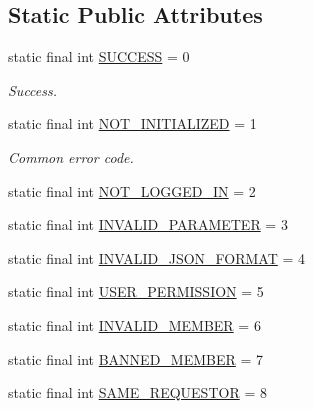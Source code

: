 \subsection*{Static Public Attributes}
\begin{DoxyCompactItemize}
\item 
static final int \hyperlink{classcom_1_1toast_1_1android_1_1gamebase_1_1base_1_1_gamebase_error_a78a8f85131c22ffd108d29766b27f2e5}{S\+U\+C\+C\+E\+SS} = 0
\begin{DoxyCompactList}\small\item\em Success. \end{DoxyCompactList}\item 
static final int \hyperlink{classcom_1_1toast_1_1android_1_1gamebase_1_1base_1_1_gamebase_error_a8eee16890e4829932e769351891ab2e5}{N\+O\+T\+\_\+\+I\+N\+I\+T\+I\+A\+L\+I\+Z\+ED} = 1
\begin{DoxyCompactList}\small\item\em Common error code. \end{DoxyCompactList}\item 
static final int \hyperlink{classcom_1_1toast_1_1android_1_1gamebase_1_1base_1_1_gamebase_error_acf8c8ed3996407204f4905342cbdb656}{N\+O\+T\+\_\+\+L\+O\+G\+G\+E\+D\+\_\+\+IN} = 2
\item 
static final int \hyperlink{classcom_1_1toast_1_1android_1_1gamebase_1_1base_1_1_gamebase_error_a55eabe442482e503ad3a382bb50ae619}{I\+N\+V\+A\+L\+I\+D\+\_\+\+P\+A\+R\+A\+M\+E\+T\+ER} = 3
\item 
static final int \hyperlink{classcom_1_1toast_1_1android_1_1gamebase_1_1base_1_1_gamebase_error_a0604bba6bca2f23564f4982fb2ebdd92}{I\+N\+V\+A\+L\+I\+D\+\_\+\+J\+S\+O\+N\+\_\+\+F\+O\+R\+M\+AT} = 4
\item 
static final int \hyperlink{classcom_1_1toast_1_1android_1_1gamebase_1_1base_1_1_gamebase_error_aed34d12ad749faa05c75f3ad028327df}{U\+S\+E\+R\+\_\+\+P\+E\+R\+M\+I\+S\+S\+I\+ON} = 5
\item 
static final int \hyperlink{classcom_1_1toast_1_1android_1_1gamebase_1_1base_1_1_gamebase_error_a6751b4f49ed64ad163350daea4088ef5}{I\+N\+V\+A\+L\+I\+D\+\_\+\+M\+E\+M\+B\+ER} = 6
\item 
static final int \hyperlink{classcom_1_1toast_1_1android_1_1gamebase_1_1base_1_1_gamebase_error_ad3860810b28946fc54d2879102c3ffd4}{B\+A\+N\+N\+E\+D\+\_\+\+M\+E\+M\+B\+ER} = 7
\item 
static final int \hyperlink{classcom_1_1toast_1_1android_1_1gamebase_1_1base_1_1_gamebase_error_ae80de9cf6cf8c7c352392a80f16a739b}{S\+A\+M\+E\+\_\+\+R\+E\+Q\+U\+E\+S\+T\+OR} = 8

\end{DoxyCompactItemize}

